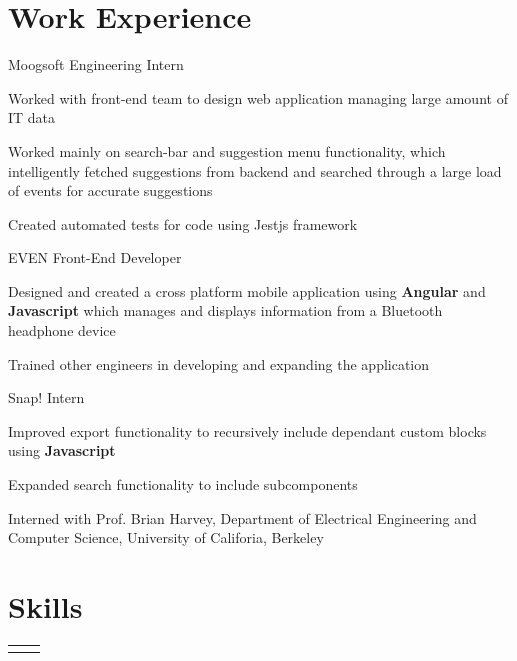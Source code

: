 \documentclass[10pt]{article}
\begin{document}
\begin{paracol}{2} %


\section{Work Experience}


{}
{Moogsoft}
{Engineering Intern}
{}
{
\item Worked with front-end team to design web application managing large amount of IT data
\item Worked mainly on search-bar and suggestion menu functionality, which intelligently fetched suggestions from backend and searched through a large load of events for accurate suggestions
\item Created automated tests for code using Jestjs framework
}

{}
{EVEN}
{Front-End Developer}
{}
{
\item Designed and created a cross platform mobile application using \textbf{Angular}
  and \textbf{Javascript} which manages and displays information from a Bluetooth
  headpho\-ne device
\item Trained other engineers in developing and expanding the application
}

{}
{Snap!}
{Intern}
{}
{
\item Improved export functionality to recursively include dependant custom
  blocks using \textbf{Javascript}
\item Expanded search functionality to include subcomponents
\item Interned with Prof. Brian Harvey, Department of Electrical Engineering
  and Computer Science, University of Califoria, Berkeley
}

\vspace{-\baselineskip}\medskip

\section{Skills}
\begin{supertabular}{rl}


\end{supertabular}
\end{paracol}
\end{document}

